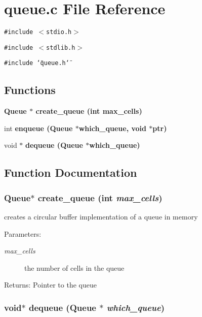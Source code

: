 \section{queue.c File Reference}
\label{queue_8c}
{\tt \#include $<$stdio.h$>$}\par
{\tt \#include $<$stdlib.h$>$}\par
{\tt \#include \char`\"{}queue.h\char`\"{}}\par
\subsection*{Functions}
\begin{CompactItemize}
\item 
\bf{Queue} $\ast$ \bf{create\_\-queue} (int max\_\-cells)
\item 
int \bf{enqueue} (\bf{Queue} $\ast$which\_\-queue, void $\ast$ptr)
\item 
void $\ast$ \bf{dequeue} (\bf{Queue} $\ast$which\_\-queue)
\end{CompactItemize}


\subsection{Function Documentation}
\subsubsection{\setlength{\rightskip}{0pt plus 5cm}\bf{Queue}$\ast$ create\_\-queue (int {\em max\_\-cells})}\label{queue_8c_37f0ebf6bb3301f99bc42638a41ab12e}


creates a circular buffer implementation of a queue in memory \begin{Desc}
\item[Parameters:]
\begin{description}
\item[{\em max\_\-cells}]the number of cells in the queue \end{description}
\end{Desc}
\begin{Desc}
\item[Returns:]Pointer to the queue \end{Desc}
\subsubsection{\setlength{\rightskip}{0pt plus 5cm}void$\ast$ dequeue (\bf{Queue} $\ast$ {\em which\_\-queue})}\label{queue_8c_f8db386ebc4c0620589024d51d83f3b5}



